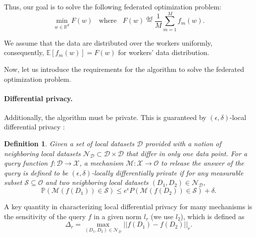 \documentclass[12pt]{article}
\newcommand{\EE}{\mathbb{E}}
\newcommand{\R}{\mathbb{R}}
\newtheorem{definition}{Definition}
\begin{document}
Thus, our goal is to solve the following federated optimization problem:
\begin{equation}
\min_{w\in \R^d}F(w)~~~~ \text{where}~~~~ F(w) \overset{\mathrm{def}}{=} \frac{1}{M}\sum_{m=1}^{M}f_{m}(w).
\end{equation}

We assume that the data are distributed over the workers uniformly, consequently, $\EE[f_{m}(w)]=F(w)$ for workers' data distribution.

Now, let us introduce the requirements for the algorithm to solve the federated optimization problem.


\paragraph{Differential privacy.}
Additionally, the algorithm must be private. This is guaranteed by $(\epsilon,\delta)$-local differential privacy \cite{Dwork2014}:
\begin{definition}
    Given a set of local datasets $\mathcal{D}$ provided with a notion of neighboring local datasets $\mathcal{N}_{\mathcal{D}}\subset \mathcal{D}\times \mathcal{D}$ that differ in only one data point. For a query function $f: \mathcal{D}\rightarrow \mathcal{X}$, a mechanism $\mathcal{M}:\mathcal{X}\rightarrow \mathcal{O}$ to release the answer of the query is defined to be $(\epsilon,\delta)$-locally differentially private if for any measurable subset $\mathcal{S}\subseteq\mathcal{O}$ and two neighboring local datasets $(D_1,D_2)\in \mathcal{N}_{\mathcal{D}}$,
    \begin{equation}
    \mathbb{P}(\mathcal{M}(f(D_1))\in \mathcal{S}) \leq e^{\epsilon}P(\mathcal{M}(f(D_2))\in \mathcal{S}) + \delta.
    \end{equation}
\end{definition}
    
    A key quantity in characterizing local differential privacy for many mechanisms is the sensitivity of the query $f$ in a given norm $l_{r}$ (we use $l_{2}$), which is defined as
    \begin{equation}\label{sensitivity}
    \Delta_{r} = \max_{(D_1,D_2)\in\mathcal{N}_{\mathcal{D}}}||f(D_1)-f(D_2)||_r.
    \end{equation}
\end{document}
